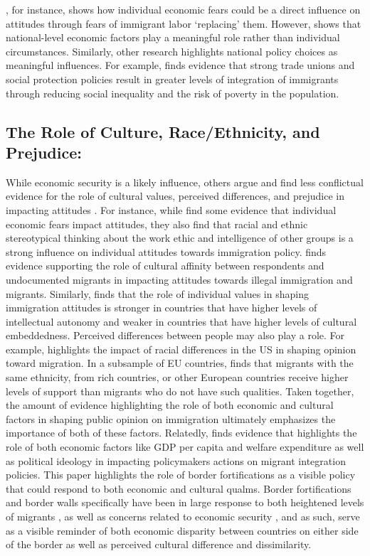 \documentclass[12pt,]{article}
\begin{document}
\citet{burns2000}, for instance, shows how individual economic fears
could be a direct influence on attitudes through fears of immigrant
labor `replacing' them. However, \citet{hainmueller2014} shows that
national-level economic factors play a meaningful role rather than
individual circumstances. Similarly, other research highlights national
policy choices as meaningful influences. For example,
\citet{artiles2014} finds evidence that strong trade unions and social
protection policies result in greater levels of integration of
immigrants through reducing social inequality and the risk of poverty in
the population.

\subsection{The Role of Culture, Race/Ethnicity, and
Prejudice:}\label{the-role-of-culture-raceethnicity-and-prejudice}

While economic security is a likely influence, others argue and find
less conflictual evidence for the role of cultural values, perceived
differences, and prejudice in impacting attitudes
\citep{heath2020, heath2020a}. For instance, while \citet{burns2000}
find some evidence that individual economic fears impact attitudes, they
also find that racial and ethnic stereotypical thinking about the work
ethic and intelligence of other groups is a strong influence on
individual attitudes towards immigration policy. \citet{espenshade1993}
finds evidence supporting the role of cultural affinity between
respondents and undocumented migrants in impacting attitudes towards
illegal immigration and migrants. Similarly, \citet{davidov2020} finds
that the role of individual values in shaping immigration attitudes is
stronger in countries that have higher levels of intellectual autonomy
and weaker in countries that have higher levels of cultural
embeddedness. Perceived differences between people may also play a role.
For example, \citet{ayers2009} highlights the impact of racial
differences in the US in shaping opinion toward migration. In a
subsample of EU countries, \citet{deconinck2020} finds that migrants
with the same ethnicity, from rich countries, or other European
countries receive higher levels of support than migrants who do not have
such qualities. Taken together, the amount of evidence highlighting the
role of both economic and cultural factors in shaping public opinion on
immigration ultimately emphasizes the importance of both of these
factors. Relatedly, \citet{solano2023} finds evidence that highlights
the role of both economic factors like GDP per capita and welfare
expenditure as well as political ideology in impacting policymakers
actions on migrant integration policies. This paper highlights the role
of border fortifications as a visible policy that could respond to both
economic and cultural qualms. Border fortifications and border walls
specifically have been in large response to both heightened levels of
migrants \citep{avdan2023}, as well as concerns related to economic
security \citep{carter2017}, and as such, serve as a visible reminder of
both economic disparity between countries on either side of the border
as well as perceived cultural difference and dissimilarity.
\end{document}
